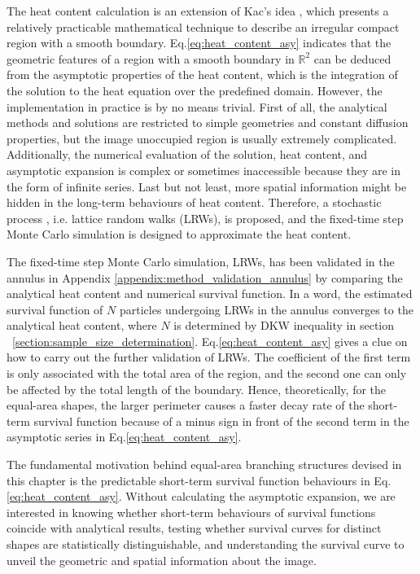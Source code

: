 The heat content
calculation \cite{desjardins1994heat} \cite{vandenberg1994heat} is an
extension of Kac's idea \cite{kac1966can}, which presents a relatively
practicable mathematical technique to describe an irregular compact
region with a smooth boundary. Eq.\ref{eq:heat_content_asy} indicates
that the geometric features of a region with a smooth boundary in
$\mathbb{R}^2$ can be deduced from the asymptotic properties of the
heat content, which is the integration of the solution to the heat
equation over the predefined domain. However, the implementation in
practice is by no means trivial. First of all, the analytical methods
and solutions are restricted to simple geometries and constant
diffusion properties, but the image unoccupied region is usually
extremely complicated. Additionally, the numerical evaluation of the
solution, heat content, and asymptotic expansion is complex or
sometimes inaccessible because they are in the form of infinite
series. Last but not least, more spatial information might be hidden
in the long-term behaviours of heat content. Therefore, a stochastic
process \cite{schuss2009theory}, i.e. lattice random walks (LRWs), is
proposed, and the fixed-time step Monte Carlo simulation is designed
to approximate the heat content.


The fixed-time step Monte Carlo simulation, LRWs, has been validated
in the annulus in Appendix \ref{appendix:method_validation_annulus} by
comparing the analytical heat content and numerical survival
function. In a word, the estimated survival function of $N$ particles
undergoing LRWs in the annulus converges to the analytical heat
content, where $N$ is determined by DKW inequality in section
~\ref{section:sample_size_determination}. Eq.\ref{eq:heat_content_asy}
gives a clue on how to carry out the further validation of LRWs. The
coefficient of the first term is only associated with the total area
of the region, and the second one can only be affected by the total
length of the boundary. Hence, theoretically, for the equal-area
shapes, the larger perimeter causes a faster decay rate of the
short-term survival function because of a minus sign in front of the
second term in the asymptotic series in Eq.\ref{eq:heat_content_asy}. 


The fundamental motivation behind equal-area branching structures
devised in this chapter is the predictable short-term survival
function behaviours in Eq.\ref{eq:heat_content_asy}. Without
calculating the asymptotic expansion, we are interested in knowing
whether short-term behaviours of survival functions coincide with
analytical results, testing whether survival curves for distinct
shapes are statistically distinguishable, and understanding the
survival curve to unveil the geometric and spatial information about
the image.  


